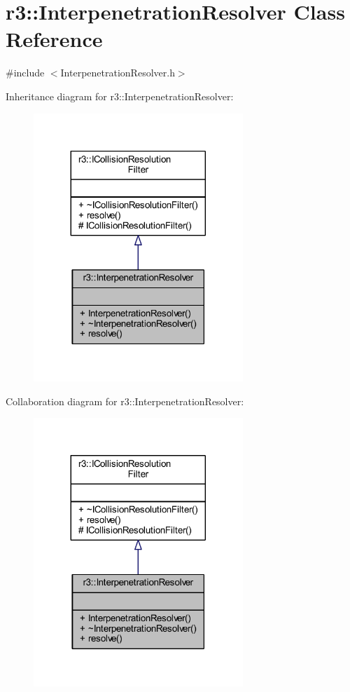\hypertarget{classr3_1_1_interpenetration_resolver}{}\section{r3\+:\+:Interpenetration\+Resolver Class Reference}
\label{classr3_1_1_interpenetration_resolver}


{\ttfamily \#include $<$Interpenetration\+Resolver.\+h$>$}



Inheritance diagram for r3\+:\+:Interpenetration\+Resolver\+:\nopagebreak
\begin{figure}[H]
\begin{center}
\leavevmode
\includegraphics[width=224pt]{classr3_1_1_interpenetration_resolver__inherit__graph}
\end{center}
\end{figure}


Collaboration diagram for r3\+:\+:Interpenetration\+Resolver\+:\nopagebreak
\begin{figure}[H]
\begin{center}
\leavevmode
\includegraphics[width=224pt]{classr3_1_1_interpenetration_resolver__coll__graph}
\end{center}
\end{figure}
